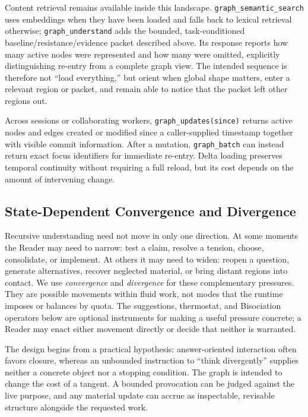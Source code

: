 Content retrieval remains available inside this landscape. \texttt{graph\_semantic\_search} uses embeddings when they have been loaded and falls back to lexical retrieval otherwise; \texttt{graph\_understand} adds the bounded, task-conditioned baseline/resistance/evidence packet described above. Its response reports how many active nodes were represented and how many were omitted, explicitly distinguishing re-entry from a complete graph view. The intended sequence is therefore not ``load everything,'' but orient when global shape matters, enter a relevant region or packet, and remain able to notice that the packet left other regions out.

Across sessions or collaborating workers, \texttt{graph\_updates(since)} returns active nodes and edges created or modified since a caller-supplied timestamp together with visible commit information. After a mutation, \texttt{graph\_batch} can instead return exact focus identifiers for immediate re-entry. Delta loading preserves temporal continuity without requiring a full reload, but its cost depends on the amount of intervening change.

\subsection{State-Dependent Convergence and Divergence}
\label{sec:exploration}

Recursive understanding need not move in only one direction. At some moments the Reader may need to narrow: test a claim, resolve a tension, choose, consolidate, or implement. At others it may need to widen: reopen a question, generate alternatives, recover neglected material, or bring distant regions into contact. We use \emph{convergence} and \emph{divergence} for these complementary pressures. They are possible movements within fluid work, not modes that the runtime imposes or balances by quota. The suggestions, thermostat, and Bisociation operators below are optional instruments for making a useful pressure concrete; a Reader may enact either movement directly or decide that neither is warranted.

The design begins from a practical hypothesis: answer-oriented interaction often favors closure, whereas an unbounded instruction to ``think divergently'' supplies neither a concrete object nor a stopping condition. The graph is intended to change the cost of a tangent. A bounded provocation can be judged against the live purpose, and any material update can accrue as inspectable, revisable structure alongside the requested work.

